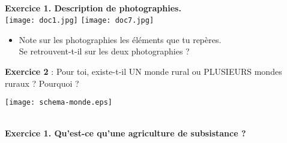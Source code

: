 \documentclass[12pt]{article}
\begin{document}
\\

\textbf{Exercice 1. Description de photographies.}\\

\texttt{[image: doc1.jpg]}
\texttt{[image: doc7.jpg]}

  \begin{itemize}
  \item Note sur les photographies les éléments que tu repères. \\
  Se retrouvent-t-il sur les deux photographies ?
  \vspace{1cm}
  \end{itemize}

\textbf{Exercice 2} : Pour toi, existe-t-il UN monde rural ou PLUSIEURS mondes ruraux ? Pourquoi ?

\vfill

\texttt{[image: schema-monde.eps]}

\newpage

\\

\textbf{Exercice 1. Qu'est-ce qu'une agriculture de subsistance ?} \\
\end{document}
